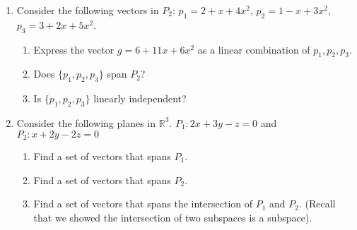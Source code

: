 \documentclass[12pt]{article}
\begin{document}
\begin{enumerate}
\item Consider the following vectors in $P_2$: $p_1 = 2 + x + 4x^2$, $p_2 = 1 - x + 3x^2$, $p_3 = 3 + 2x + 5x^2$.
\begin{enumerate}
\item Express the vector $g = 6 + 11x + 6x^2$ as a linear combination of $p_1,p_2,p_3$.
\item Does $\{p_1,p_2,p_3\}$ span $P_2$?
\item Is $\{p_1,p_2,p_3\}$ linearly independent?
\end{enumerate}



\item Consider the following planes in $\mathbb{R}^3$. $P_1: 2x + 3y - z = 0$ and $P_2: x + 2y - 2z = 0$
\begin{enumerate}
\item Find a set of vectors that spans $P_1$.
\item Find a set of vectors that spans $P_2$.
\item Find a set of vectors that spans the intersection of $P_1$ and $P_2$. (Recall that we showed the intersection of two subspaces is a subspace).
\end{enumerate}



\end{enumerate}
\end{document}
